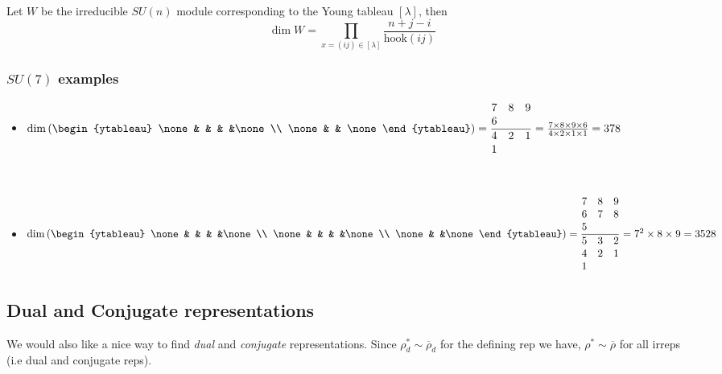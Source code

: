 \begin{enumerate}
Let $W$ be the irreducible $SU(n)$ module corresponding to the Young tableau $[\lambda]$, then
\begin{equation}
    \dim W = \prod_{x = (ij)\in[\lambda]}\frac{n+j-i}{\text{hook}(ij)}
\end{equation}

\subsubsection{$SU(7)$ examples}
\begin{itemize}
    \item {}
    $\dim\left(\begin{ytableau}
    \none & & & &\none\\
    \none & & \none
    \end{ytableau}\right) = \frac{\begin{matrix}
        7 & 8 & 9\\
        6
    \end{matrix}}{\begin{matrix}
        4 & 2 & 1\\
        1
    \end{matrix}}= \frac{7 \times 8 \times 9\times 6}{4\times 2\times  1\times 1} = 378$
    
    $ $
    
    \item {}
    $\dim\left(\begin{ytableau}
    \none & & & &\none\\
    \none & & & &\none\\
    \none & &\none
    \end{ytableau}\right) = \frac{\begin{matrix}
        7 & 8 & 9\\
        6 & 7 & 8\\
        5
    \end{matrix}}{\begin{matrix}
        5 & 3 & 2\\
        4 & 2 & 1\\
        1
    \end{matrix}}= 7^2\times 8\times 9 = 3528$
\end{itemize}
\subsection{Dual and Conjugate representations}
We would also like a nice way to find \textit{dual} and \textit{conjugate} representations. Since $\rho^*_d\sim{}\overline{\rho}_d$ for the defining rep we have, $\rho^*\sim{}\overline{\rho}$ for all irreps (i.e dual and conjugate reps). 


\end{enumerate}
